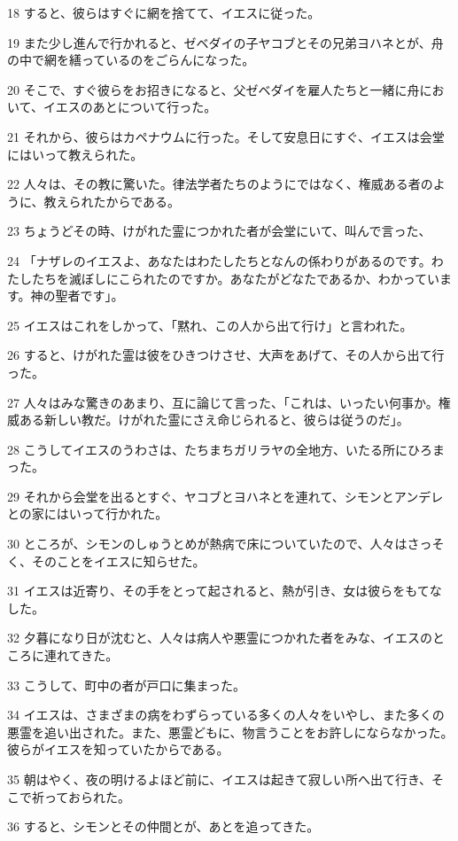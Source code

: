 \par 18 すると、彼らはすぐに網を捨てて、イエスに従った。
\par 19 また少し進んで行かれると、ゼベダイの子ヤコブとその兄弟ヨハネとが、舟の中で網を繕っているのをごらんになった。
\par 20 そこで、すぐ彼らをお招きになると、父ゼベダイを雇人たちと一緒に舟において、イエスのあとについて行った。
\par 21 それから、彼らはカペナウムに行った。そして安息日にすぐ、イエスは会堂にはいって教えられた。
\par 22 人々は、その教に驚いた。律法学者たちのようにではなく、権威ある者のように、教えられたからである。
\par 23 ちょうどその時、けがれた霊につかれた者が会堂にいて、叫んで言った、
\par 24 「ナザレのイエスよ、あなたはわたしたちとなんの係わりがあるのです。わたしたちを滅ぼしにこられたのですか。あなたがどなたであるか、わかっています。神の聖者です」。
\par 25 イエスはこれをしかって、「黙れ、この人から出て行け」と言われた。
\par 26 すると、けがれた霊は彼をひきつけさせ、大声をあげて、その人から出て行った。
\par 27 人々はみな驚きのあまり、互に論じて言った、「これは、いったい何事か。権威ある新しい教だ。けがれた霊にさえ命じられると、彼らは従うのだ」。
\par 28 こうしてイエスのうわさは、たちまちガリラヤの全地方、いたる所にひろまった。
\par 29 それから会堂を出るとすぐ、ヤコブとヨハネとを連れて、シモンとアンデレとの家にはいって行かれた。
\par 30 ところが、シモンのしゅうとめが熱病で床についていたので、人々はさっそく、そのことをイエスに知らせた。
\par 31 イエスは近寄り、その手をとって起されると、熱が引き、女は彼らをもてなした。
\par 32 夕暮になり日が沈むと、人々は病人や悪霊につかれた者をみな、イエスのところに連れてきた。
\par 33 こうして、町中の者が戸口に集まった。
\par 34 イエスは、さまざまの病をわずらっている多くの人々をいやし、また多くの悪霊を追い出された。また、悪霊どもに、物言うことをお許しにならなかった。彼らがイエスを知っていたからである。
\par 35 朝はやく、夜の明けるよほど前に、イエスは起きて寂しい所へ出て行き、そこで祈っておられた。
\par 36 すると、シモンとその仲間とが、あとを追ってきた。
